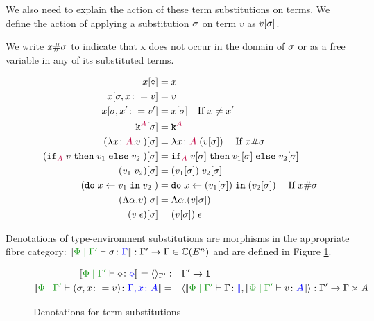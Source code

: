 \documentclass{Report}
\begin{document}
We also need to explain the action of these term substitutions on terms. We define the action of applying a substitution $\sigma$  on term $v$ as $v[\sigma]$. 


\begin{framed}
    \begin{definition}[Freshness]
        We write $x\#\sigma$ to indicate that x does not occur in the domain of $\sigma$ or as a free variable in any of its substituted terms.
    \end{definition}
\end{framed}

\begin{align*}
    x[\diamond] & = x \\
    x[\sigma,x\colon= v] & = v \\
    x[\sigma,x'\colon= v'] & = x[\sigma]\quad\text{If }x \neq x'\\
    \texttt{k}^{\color{purple} A}[\sigma] & = \texttt{k}^{\color{purple} A} \\
    (\lambda x \colon {\color{purple}A}. v\;)[\sigma] &= \lambda x \colon {\color{purple}A}. (v[\sigma])\;\quad\text{If }x\#\sigma\\
    (\texttt{if}_{\textcolor{purple}{A}}\; v\; \texttt{then}\; v_1 \;\texttt{else} \; v_2\;)[\sigma] &= \texttt{if}_{\textcolor{purple}{A}}\; v[\sigma]\; \texttt{then}\; v_1[\sigma] \;\texttt{else} \; v_2[\sigma]\;\\
    (v_1\; v_2)[\sigma]&= (v_1[\sigma])\; v_2[\sigma]\\
    (\texttt{do}\; x \leftarrow v_1 \;\texttt{in}\; v_2\;)&= \texttt{do}\; x \leftarrow (v_1[\sigma]) \;\texttt{in}\; (v_2[\sigma])\;\quad\text{If } x\#\sigma\\
    (\Lambda \alpha. v)[\sigma] & = \Lambda \alpha. (v[\sigma])\\
    (v\;\epsilon)[\sigma] & = (v[\sigma])\;\epsilon\\
\end{align*}

Denotations of type-environment substitutions are morphisms in the appropriate fibre category: $\deno{\etyperelation{\P}{\G'}{\si}{\G}}: \G' \rightarrow \G \in \C(E^n)$ and are defined in Figure \ref{TermSubstitutionDenotations}.

\begin{figure}[H]
    \centering
    \begin{framed}
\begin{align*}
    \deno{\etyperelation{\P}{\G'}{\nil}{\nil}} = \term{\G'}:&\quad \G' \rightarrow \1
    \\
    \deno{\etyperelation{\P}{\G'}{(\si, x \setto v)}{\gax}} =&\quad \pr{\deno{\etyperelation{\P}{\G'}{\G}}}{\deno{\etyperelation{\P}{\G'}{v}{A}}}: \G' \rightarrow \G\times A
\end{align*}
    \end{framed}
    \caption{Denotations for term substitutions}
    \label{TermSubstitutionDenotations}
\end{figure}
\end{document}
